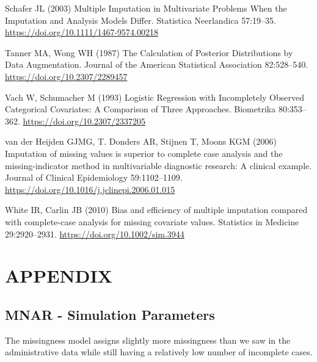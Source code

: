 \documentclass[
  letterpaper,
  DIV=11,
  numbers=noendperiod]{scrartcl}
\newlength{\cslhangindent}
\newlength{\cslentryspacingunit} %
\newenvironment{CSLReferences}[2] %
 {%
  \setlength{\parindent}{0pt}
  \ifodd #1
  \let\oldpar\par
  \def\par{\hangindent=\cslhangindent\oldpar}
  \fi
  \setlength{\parskip}{#2\cslentryspacingunit}
 }%
 {}
\begin{document}
\begin{CSLReferences}{1}{0}
\leavevmode{}%
Schafer JL (2003) Multiple {Imputation} in {Multivariate Problems When}
the {Imputation} and {Analysis Models Differ}. Statistica Neerlandica
57:19--35. \url{https://doi.org/10.1111/1467-9574.00218}

\leavevmode{}%
Tanner MA, Wong WH (1987) The {Calculation} of {Posterior Distributions}
by {Data Augmentation}. Journal of the American Statistical Association
82:528--540. \url{https://doi.org/10.2307/2289457}

\leavevmode{}%
Vach W, Schumacher M (1993) Logistic {Regression} with {Incompletely
Observed Categorical Covariates}: {A Comparison} of {Three Approaches}.
Biometrika 80:353--362. \url{https://doi.org/10.2307/2337205}

\leavevmode{}%
van der Heijden GJMG, T. Donders AR, Stijnen T, Moons KGM (2006)
Imputation of missing values is superior to complete case analysis and
the missing-indicator method in multivariable diagnostic research: {A}
clinical example. Journal of Clinical Epidemiology 59:1102--1109.
\url{https://doi.org/10.1016/j.jclinepi.2006.01.015}

\leavevmode{}%
White IR, Carlin JB (2010) Bias and efficiency of multiple imputation
compared with complete-case analysis for missing covariate values.
Statistics in Medicine 29:2920--2931.
\url{https://doi.org/10.1002/sim.3944}

\end{CSLReferences}

\hypertarget{appendix}{%
\section{APPENDIX}\label{appendix}}

\hypertarget{sec-mnar}{%
\subsection{MNAR - Simulation Parameters}\label{sec-mnar}}

The missingness model assigns slightly more missingness than we saw in
the administrative data while still having a relatively low number of
incomplete cases.
\end{document}
